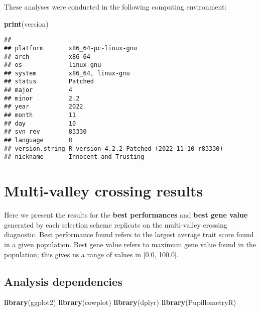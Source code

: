 \documentclass[]{book}
\newenvironment{Shaded}{\begin{snugshade}}{\end{snugshade}}
\newcommand{\KeywordTok}[1]{\textcolor[rgb]{0.13,0.29,0.53}{\textbf{#1}}}
\newcommand{\NormalTok}[1]{#1}
\begin{document}
These analyses were conducted in the following computing environment:

\begin{Shaded}
\begin{Highlighting}[]
\KeywordTok{print}\NormalTok{(version)}
\end{Highlighting}
\end{Shaded}

\begin{verbatim}
##                _                                          
## platform       x86_64-pc-linux-gnu                        
## arch           x86_64                                     
## os             linux-gnu                                  
## system         x86_64, linux-gnu                          
## status         Patched                                    
## major          4                                          
## minor          2.2                                        
## year           2022                                       
## month          11                                         
## day            10                                         
## svn rev        83330                                      
## language       R                                          
## version.string R version 4.2.2 Patched (2022-11-10 r83330)
## nickname       Innocent and Trusting
\end{verbatim}

\hypertarget{multi-valley-crossing-results}{%
\chapter{Multi-valley crossing results}\label{multi-valley-crossing-results}}

Here we present the results for the \textbf{best performances} and \textbf{best gene value} generated by each selection scheme replicate on the multi-valley crossing diagnostic.
Best performance found refers to the largest average trait score found in a given population.
Best gene value refers to maximum gene value found in the population; this gives us a range of values in {[}0.0, 100.0{]}.

\hypertarget{analysis-dependencies}{%
\section{Analysis dependencies}\label{analysis-dependencies}}

\begin{Shaded}
\begin{Highlighting}[]
\KeywordTok{library}\NormalTok{(ggplot2)}
\KeywordTok{library}\NormalTok{(cowplot)}
\KeywordTok{library}\NormalTok{(dplyr)}
\KeywordTok{library}\NormalTok{(PupillometryR)}
\end{Highlighting}
\end{Shaded}
\end{document}
